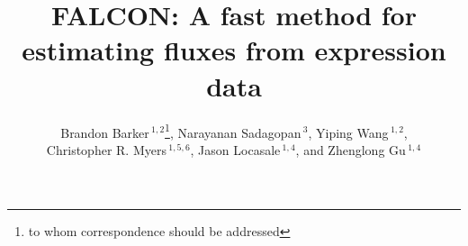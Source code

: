 \documentclass{bioinfo}
\begin{document}





\title[FALCON]{FALCON: A fast method for estimating fluxes
  from expression data}
  \author[Barker \textit{et~al.}]{Brandon Barker\,$^{1,2}$\footnote{to whom correspondence should be addressed},
    Narayanan Sadagopan\,$^{3}$, Yiping Wang\,$^{1,2}$, \\
    Christopher R. Myers\,$^{1,5,6}$, Jason Locasale\,$^{1,4}$, 
    and Zhenglong Gu\,$^{1,4}$\\
 }

\address{$^{1}$Tri-Institutional Training Program in Computational
  Biology and Medicine, 1300 York Avenue, Box 194, New York, NY 10065\\
  $^{2}$Department of Biological Statistics and Computational Biology, 
    Cornell University, 1198 Comstock Hall, Ithaca, NY 14853-2601\\
  $^{3}$College of Engineering, Cornell University, Carpenter Hall, 
    Ithaca, NY 14853-2201\\
  $^{4}$Division of Nutritional Sciences, Cornell University, 
    Savage Hall, Ithaca, NY 14853-2201\\
  $^{5}$Life Sciences Core Laboratories Center, Cornell University, 
    Ithaca, NY 14853-2201\\
  $^{6}$Laboratory of Atomic and Solid State Physics, Physical Sciences Building,
    Cornell University, Ithaca, NY 14853-2201\\}



\maketitle
\end{document}
